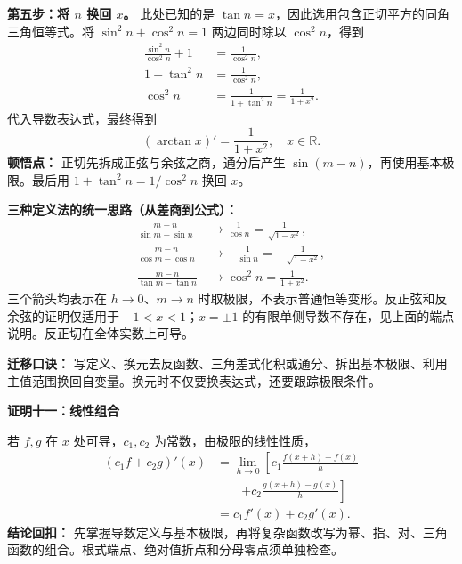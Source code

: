 \begin{proofbox}
\textbf{第五步：将 $n$ 换回 $x$。} 此处已知的是 $\tan n=x$，因此选用包含正切平方的同角三角恒等式。将 $\sin^2n+\cos^2n=1$ 两边同时除以 $\cos^2n$，得到
\[
\begin{aligned}
\frac{\sin^2n}{\cos^2n}+1&=\frac1{\cos^2n},\\
1+\tan^2n&=\frac1{\cos^2n},\\
\cos^2n&=\frac1{1+\tan^2n}=\frac1{1+x^2}.
\end{aligned}
\]
代入导数表达式，最终得到
\[
\boxed{(\arctan x)'=\frac1{1+x^2},\quad x\in\mathbb R}.
\]
\textbf{顿悟点：} 正切先拆成正弦与余弦之商，通分后产生 $\sin(m-n)$，再使用基本极限。最后用 $1+\tan^2n=1/\cos^2n$ 换回 $x$。

\medskip
\textbf{三种定义法的统一思路（从差商到公式）：}
\[
\begin{aligned}
\frac{m-n}{\sin m-\sin n}&\longrightarrow\frac1{\cos n}
=\frac1{\sqrt{1-x^2}},\\[3pt]
\frac{m-n}{\cos m-\cos n}&\longrightarrow-\frac1{\sin n}
=-\frac1{\sqrt{1-x^2}},\\[3pt]
\frac{m-n}{\tan m-\tan n}&\longrightarrow\cos^2n
=\frac1{1+x^2}.
\end{aligned}
\]
三个箭头均表示在 $h\to0$、$m\to n$ 时取极限，不表示普通恒等变形。反正弦和反余弦的证明仅适用于 $-1<x<1$；$x=\pm1$ 的有限单侧导数不存在，见上面的端点说明。反正切在全体实数上可导。

\textbf{迁移口诀：} 写定义、换元去反函数、三角差式化积或通分、拆出基本极限、利用主值范围换回自变量。换元时不仅要换表达式，还要跟踪极限条件。


\medskip
\begin{minipage}{\linewidth}
\textbf{\textcolor{CProof}{证明十一：线性组合}}


\end{minipage}

若 $f,g$ 在 $x$ 处可导，$c_1,c_2$ 为常数，由极限的线性性质，
\[
\begin{aligned}
(c_1 f+c_2 g)'(x)
&=\lim_{h\to0}\left[c_1\frac{f(x+h)-f(x)}h\right.\\
&\qquad\left.+c_2\frac{g(x+h)-g(x)}h\right]\\
&=c_1f'(x)+c_2g'(x).
\end{aligned}
\]
\textbf{\textcolor{CProof}{结论回扣：}} 先掌握导数定义与基本极限，再将复杂函数改写为幂、指、对、三角函数的组合。根式端点、绝对值折点和分母零点须单独检查。
\end{proofbox}
